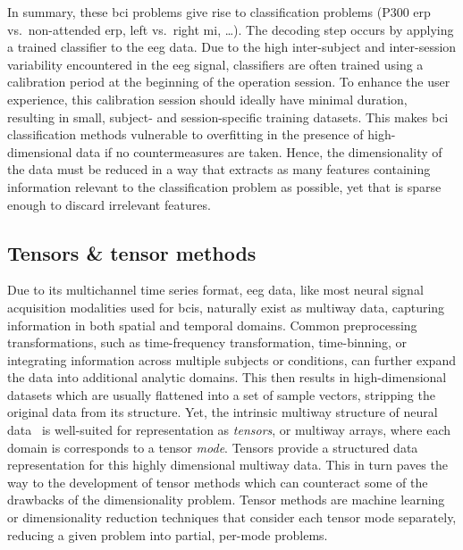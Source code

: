 \documentclass[twocolumn]{article}
\begin{document}
In summary, these \ac{bci} problems give rise to classification problems (P300
\ac{erp} vs.\ non-attended \ac{erp}, left vs.\ right \ac{mi}, \ldots).
The decoding step occurs by applying a trained classifier to the  \ac{eeg}
data.
Due to the high inter-subject and inter-session variability encountered in
the \ac{eeg} signal, classifiers are often trained using a calibration period
at the beginning of the operation session.
To enhance the user experience, this calibration session should ideally have minimal
duration, resulting in small, subject- and session-specific training datasets.
This makes \ac{bci} classification methods vulnerable to overfitting in the
presence of high-dimensional data if no countermeasures are taken.
Hence, the dimensionality of the data must be reduced in a way that extracts as
many features containing information relevant to the classification problem as
possible, yet that is sparse enough to discard irrelevant features.

\subsection{Tensors \& tensor methods}

Due to its multichannel time series format, \ac{eeg} data, like most neural
signal acquisition modalities used for \acp{bci}, naturally exist as multiway data,
capturing information in both spatial and temporal domains.
Common preprocessing transformations, such as time-frequency transformation,
time-binning, or integrating information across multiple subjects or conditions,
can further expand the data into additional analytic domains.
This then results in high-dimensional datasets which are usually flattened into a
set of sample vectors, stripping the original data from its structure.
Yet, the intrinsic multiway structure of neural data~\cite{Erol2022} is
well-suited for representation as \emph{tensors}, or multiway arrays, where
each domain is corresponds to a tensor \emph{mode}.
Tensors provide a structured data representation for this highly dimensional
multiway data.
This in turn paves the way to the development of tensor methods which can
counteract some of the drawbacks of the dimensionality problem.
Tensor methods are machine learning or dimensionality reduction techniques that
consider each tensor mode separately, reducing a given problem into partial,
per-mode problems.
\end{document}
